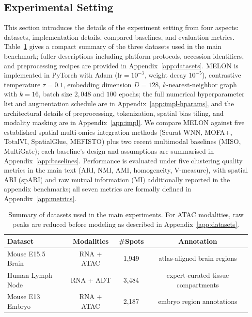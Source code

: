 \documentclass{article}
\theoremstyle{plain}
\theoremstyle{definition}
\begin{document}
\subsection{Experimental Setting}
This section introduces the details of the experiment setting from four aspects: datasets, implementation details, compared baselines, and evaluation metrics. Table~\ref{tab:dataset-summary} gives a compact summary of the three datasets used in the main benchmark; fuller descriptions including platform protocols, accession identifiers, and preprocessing recipes are provided in Appendix~\ref{app:datasets}. MELON is implemented in PyTorch with Adam ($\mathrm{lr}=10^{-3}$, weight decay $10^{-5}$), contrastive temperature $\tau{=}0.1$, embedding dimension $D{=}128$, $k$-nearest-neighbor graph with $k{=}16$, batch size $2{,}048$ and $100$ epochs; the full numerical hyperparameter list and augmentation schedule are in Appendix~\ref{app:impl-hparams}, and the architectural details of preprocessing, tokenization, spatial bias tiling, and modality masking are in Appendix~\ref{app:impl}. We compare MELON against five established spatial multi-omics integration methods (Seurat WNN, MOFA+, TotalVI, SpatialGlue, MEFISTO) plus two recent multimodal baselines (MISO, MultiGate); each baseline's design and assumptions are summarised in Appendix~\ref{app:baselines}. Performance is evaluated under five clustering quality metrics in the main text (ARI, NMI, AMI, homogeneity, V-measure), with spatial ARI (spARI) and raw mutual information (MI) additionally reported in the appendix benchmarks; all seven metrics are formally defined in Appendix~\ref{app:metrics}.

\begin{table}[H]
\centering
\caption{Summary of datasets used in the main experiments. For ATAC modalities, raw peaks are reduced before modeling as described in Appendix~\ref{app:datasets}.}
\label{tab:dataset-summary}
\small
\begin{tabular}{lccc}
\toprule
Dataset & Modalities & \#Spots & Annotation \\
\midrule
Mouse E15.5 Brain & RNA + ATAC & 1{,}949 & atlas-aligned brain regions \\
Human Lymph Node & RNA + ADT & 3{,}484 & expert-curated tissue compartments \\
Mouse E13 Embryo & RNA + ATAC & 2{,}187 & embryo region annotations \\
\bottomrule
\end{tabular}
\end{table}
\end{document}
